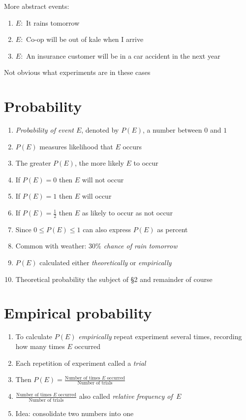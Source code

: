 \documentclass{ximera}
\begin{document}
\begin{example}
More abstract events:
\begin{enumerate}
\item $E:$ It rains tomorrow
\item $E:$ Co-op will be out of kale when I arrive
\item $E:$ An insurance customer will be in a car accident in the next year
\end{enumerate}
Not obvious what experiments are in these cases
\end{example}

\section{Probability}
\begin{enumerate}
\item {\em Probability of event $E$}, denoted by $P\left(E\right)$,
a number between $0$ and $1$
\item $P\left(E\right)$ measures likelihood that $E$ occurs
\item The greater $P\left(E\right)$, the more likely $E$ to occur
\item If $P\left(E\right)=0$ then $E$ will not occur
\item If $P\left(E\right)=1$ then $E$ will occur
\item If $P\left(E\right)=\frac{1}{2}$ then $E$ 
as likely to occur as not occur
\item Since $0\le P\left(E\right)\le 1$ can also express
$P\left(E\right)$ as percent
\item Common with weather: {\em $30\%$ chance of rain tomorrow}
\item $P\left(E\right)$ calculated either {\em theoretically}
or {\em empirically}
\item Theoretical probability the subject of \S2 and remainder of course
\end{enumerate}

\section{Empirical probability}
\begin{enumerate}
\item To calculate $P\left(E\right)$ {\em empirically}
repeat experiment several times, recording how
many times $E$ occurred
\item Each repetition of experiment called a {\em trial}
\item Then $P\left(E\right)=\frac{\text{Number of times $E$ occurred}}{\text{Number of trials}}$
\item $\frac{\text{Number of times $E$ occurred}}{\text{Number of trials}}$ also called
{\em relative frequency of~$E$}
\item Idea: consolidate two numbers into one
\end{enumerate}
\end{document}
